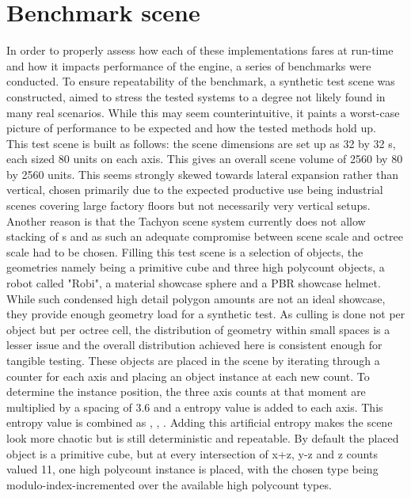 \section{Benchmark scene}
In order to properly assess how each of these implementations fares at run-time and how it impacts performance of the engine, a series of benchmarks were conducted. To ensure repeatability of the benchmark, a synthetic test scene was constructed, aimed to stress the tested systems to a degree not likely found in many real scenarios. While this may seem counterintuitive, it paints a worst-case picture of performance to be expected and how the tested methods hold up. \\
This test scene is built as follows: the scene dimensions are set up as 32 by 32 s, each  sized 80 units on each axis. This gives an overall scene volume of 2560 by 80 by 2560 units. This seems strongly skewed towards lateral expansion rather than vertical, chosen primarily due to the expected productive use being industrial scenes covering large factory floors but not necessarily very vertical setups. Another reason is that the Tachyon scene  system currently does not allow stacking of s and as such an adequate compromise between scene scale and octree scale had to be chosen. 
Filling this test scene is a selection of objects, the geometries namely being a primitive cube and three high polycount objects, a robot called "Robi", a material showcase sphere and a PBR showcase helmet. While such condensed high detail polygon amounts are not an ideal showcase, they provide enough geometry load for a synthetic test. As culling is done not per object but per octree cell, the distribution of geometry within small spaces is a lesser issue and the overall distribution achieved here is consistent enough for tangible testing. These objects are placed in the scene by iterating through a counter for each axis and placing an object instance at each new count. To determine the instance position, the three axis counts at that moment are multiplied by a spacing of 3.6 and a entropy value is added to each axis. This entropy value is combined as , , . Adding this artificial entropy makes the scene look more chaotic but is still deterministic and repeatable.
By default the placed object is a primitive cube, but at every intersection of x+z, y-z and z counts valued 11, one high polycount instance is placed, with the chosen type being modulo-index-incremented over the available high polycount types. 
